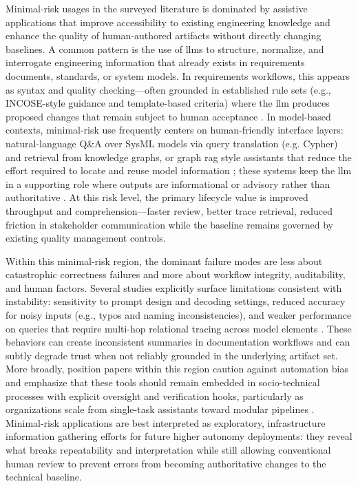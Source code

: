  Minimal-risk usages in the surveyed literature is dominated by assistive applications that improve accessibility to existing engineering knowledge and enhance the quality of human-authored artifacts without directly changing baselines. A common pattern is the use of \acp{llm} to structure, normalize, and interrogate engineering information that already exists in requirements documents, standards, or system models. In requirements workflows, this appears as syntax and quality checking—often grounded in established rule sets (e.g., INCOSE-style guidance and template-based criteria) where the \ac{llm} produces proposed changes that remain subject to human acceptance \cite{deoliveira_ImpactAnalysisUsing_2024, Stein_Leveraging_LLMs_Requirements_Generation_SE_Guidelines_2025}. In model-based contexts, minimal-risk use frequently centers on human-friendly interface layers: natural-language Q\&A over SysML models via query translation (e.g. Cypher) and retrieval from knowledge graphs, or graph \ac{rag} style assistants that reduce the effort required to locate and reuse model information \cite{sugawara_ExtractingInformationSystem_2025, quast_EnablingHumansAI_2026, manno_AcceleratingSemanticDigitalThread_2024}; these systems keep the \ac{llm} in a supporting role where outputs are informational or advisory rather than authoritative \cite{dehart_LeveragingLargeLanguage_2024}. At this risk level, the primary lifecycle value is improved throughput and comprehension—faster review, better trace retrieval, reduced friction in stakeholder communication while the baseline remains governed by existing quality management controls.

Within this minimal-risk region, the dominant failure modes are less about catastrophic correctness failures and more about workflow integrity, auditability, and human factors. Several studies explicitly surface limitations consistent with instability: sensitivity to prompt design and decoding settings, reduced accuracy for noisy inputs (e.g., typos and naming inconsistencies), and weaker performance on queries that require multi-hop relational tracing across model elements \cite{SmithCrabb_Jones_Bernard_Prompt_Technique_SE_Artifacts_2024, sugawara_ExtractingInformationSystem_2025}. These behaviors can create inconsistent summaries in documentation workflows and can subtly degrade trust when not reliably grounded in the underlying artifact set. More broadly, position papers within this region caution against automation bias and emphasize that these tools should remain embedded in socio-technical processes with explicit oversight and verification hooks, particularly as organizations scale from single-task assistants toward modular pipelines \cite{dehart_LeveragingLargeLanguage_2024, Raz_SARAI_Architecture_2024, younus_AIOntologyBasedEnhancementsFMEA_2025}. Minimal-risk applications are best interpreted as exploratory, infrastructure information gathering efforts for future higher autonomy deployments: they reveal what breaks repeatability and interpretation while still allowing conventional human review to prevent errors from becoming authoritative changes to the technical baseline.


